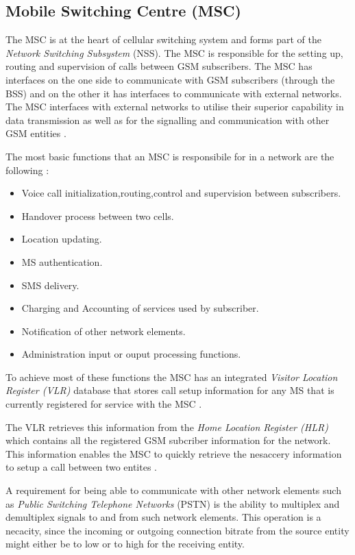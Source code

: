 \subsection{Mobile Switching Centre (MSC)}

The MSC is at the heart of cellular switching system and forms part of the \emph{Network Switching Subsystem} (NSS). The MSC is responsible for the setting up, routing and supervision of calls between GSM subscribers. The MSC has interfaces on the one side to communicate with GSM subscribers (through the BSS) and on the other it has interfaces to communicate with external networks. The MSC interfaces with external networks to utilise their superior capability in data transmission as well as for the signalling and communication with other GSM entities \cite{GSM92}. 

The most basic functions that an MSC is responsibile for in a network are the following \cite{wirelesstelcoMullet}:
\begin{itemize}
\item Voice call initialization,routing,control and supervision between subscribers.
\item Handover process between two cells.
\item Location updating.
\item MS authentication.
\item SMS delivery.
\item Charging and Accounting of services used by subscriber.
\item Notification of other network elements.
\item Administration input or ouput processing functions.
\end{itemize}

To achieve most of these functions the MSC has an integrated \emph{Visitor Location Register (VLR)} database that stores call setup information for any MS that is currently registered for service with the MSC \cite{GSM92,wirelesstelcoMullet}. 

The VLR retrieves this information from the \emph{Home Location Register (HLR)} which contains all the registered GSM subcriber information for the network. This information enables the MSC to quickly retrieve the nesaccery information to setup a call between two entites \cite{GSMSysEngin,GSMSecurInTeleNetwork}.

A requirement for being able to communicate with other network elements such as \emph{Public Switching Telephone Networks} (PSTN) is the ability to multiplex and demultiplex signals to and from such network elements. This operation is a necacity, since the incoming or outgoing connection bitrate from the source entity might either be to low or to high for the receiving entity.

